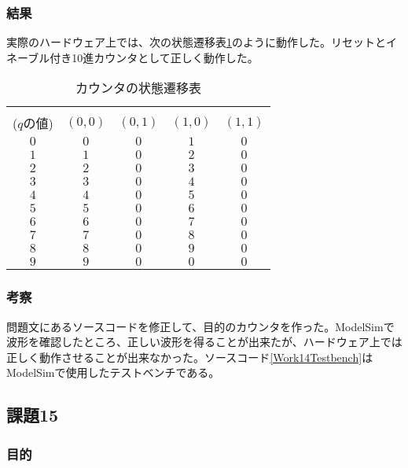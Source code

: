 \documentclass[a4paper]{jarticle}
\begin{document}
\subsubsection{結果}
実際のハードウェア上では、次の状態遷移表\ref{Work14StateTransitionTable}のように動作した。リセットとイネーブル付き10進カウンタとして正しく動作した。
\begin{table}[ht]
	\begin{center}
		\caption{カウンタの状態遷移表}
		\label{Work14StateTransitionTable}
		\begin{tabular}{|c||c|c|c|c|}
			\hline
			\backslashbox{現状態\\($q$の値)}{$\left(en,clr\right)$}	&$\left(0,0\right)$	&$\left(0,1\right)$	&$\left(1,0\right)$	&$\left(1,1\right)$\\	\hline
			$0$							&$0$			&$0$			&$1$			&$0$\\			\hline
			$1$							&$1$			&$0$			&$2$			&$0$\\			\hline
			$2$							&$2$			&$0$			&$3$			&$0$\\			\hline
			$3$							&$3$			&$0$			&$4$			&$0$\\			\hline
			$4$							&$4$			&$0$			&$5$			&$0$\\			\hline
			$5$							&$5$			&$0$			&$6$			&$0$\\			\hline
			$6$							&$6$			&$0$			&$7$			&$0$\\			\hline
			$7$							&$7$			&$0$			&$8$			&$0$\\			\hline
			$8$							&$8$			&$0$			&$9$			&$0$\\			\hline
			$9$							&$9$			&$0$			&$0$			&$0$\\			\hline
		\end{tabular}
	\end{center}
\end{table}
\subsubsection{考察}
問題文にあるソースコードを修正して、目的のカウンタを作った。ModelSimで波形を確認したところ、正しい波形を得ることが出来たが、ハードウェア上では正しく動作させることが出来なかった。ソースコード\ref{Work14Testbench}はModelSimで使用したテストベンチである。

\subsection{課題15}
\subsubsection{目的}
\end{document}
